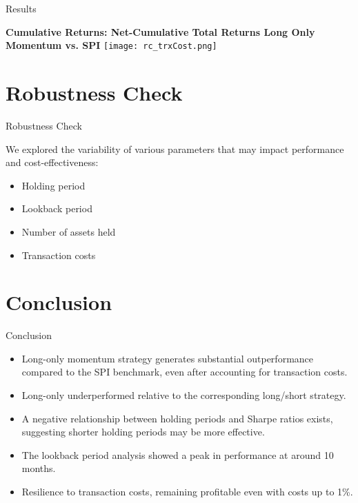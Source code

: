 \documentclass[10pt]{beamer}
\begin{document}
\begin{frame}{Results}
    \begin{center}
        {\footnotesize \textbf{Cumulative Returns: Net-Cumulative Total Returns Long Only Momentum vs. SPI}}
        \vspace{0.5cm} %
        \texttt{[image: rc\_trxCost.png]}
    \end{center}
\end{frame}


\section{Robustness Check}
\begin{frame}{Robustness Check}

We explored the variability of various parameters that may impact performance and cost-effectiveness:

\begin{itemize}
    \item Holding period
    \item Lookback period
    \item Number of assets held
    \item Transaction costs    
\end{itemize}
\end{frame}


\section{Conclusion}
\begin{frame}{Conclusion}

\begin{itemize}
    \item Long-only momentum strategy generates substantial outperformance compared to the SPI benchmark, even after accounting for transaction costs.
    \item Long-only underperformed relative to the corresponding long/short strategy.
    \item A negative relationship between holding periods and Sharpe ratios exists, suggesting shorter holding periods may be more effective.
    \item The lookback period analysis showed a peak in performance at around 10 months. 
    \item Resilience to transaction costs, remaining profitable even with costs up to 1\%.      
\end{itemize}
\end{frame}
\end{document}
